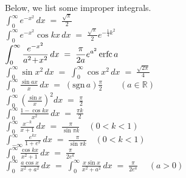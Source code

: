 \documentclass[12pt]{article}
\theoremstyle{definition}
\begin{document}
Below, we list some  
 improper 
integrals.\\

 \; $\displaystyle\int_0^\infty e^{-x^2}\,dx \;=\; \frac{\sqrt{\pi}}{2}$\\

 \; $\displaystyle\int_0^\infty e^{-x^2}\cos{kx}\,dx\;=\;\frac{\sqrt{\pi}}{2}e^{-\frac{1}{4}k^2}$\\

 \; $\displaystyle\int_0^\infty \frac{e^{-x^2}}{a^2\!+\!x^2}\,dx 
\;=\;\frac{\pi}{2a}e^{a^2}\,{\rm erfc}\,a$\\

 \; $\displaystyle\int_0^\infty\sin{x^2}\,dx \;=\; \int_0^\infty\cos{x^2}\,dx \;=\; 
\frac{\sqrt{2\pi}}{4}$\\

 \; $\displaystyle\int_0^\infty\frac{\sin{ax}}{x}\,dx \;=\; (\mbox{sgn}\,a)\frac{\pi}{2}
\qquad (a \in \mathbb{R})$\\

 \; $\displaystyle\int_0^\infty\left(\frac{\sin{x}}{x}\right)^2 dx \;=\; \frac{\pi}{2}$\\

 \; $\displaystyle\int_0^\infty\frac{1-\cos{kx}}{x^2}\,dx \;=\; \frac{\pi k}{2}$\\

 \; $\displaystyle\int_0^\infty\frac{x^{-k}}{x\!+\!1}\,dx \;=\; \frac{\pi}{\sin{\pi k}} 
\quad (0 < k < 1)$\\

 \; $\displaystyle\int_{-\infty}^\infty\frac{e^{kx}}{1\!+\!e^x}\,dx \;=\; \frac{\pi}{\sin{\pi k}} 
\quad (0 < k < 1)$\\

 \; $\displaystyle\int_0^\infty\frac{\cos{kx}}{x^2\!+\!1}\,dx \;=\; \frac{\pi}{2e^k}$\\

 \; $\displaystyle\int_0^\infty\frac{a\cos{x}}{x^2\!+\!a^2}\,dx 
\;=\; \int_0^\infty\frac{x\sin{x}}{x^2\!+\!a^2}\,dx \;=\; \frac{\pi}{2e^a} \quad\; (a > 0)$\\
\end{document}
